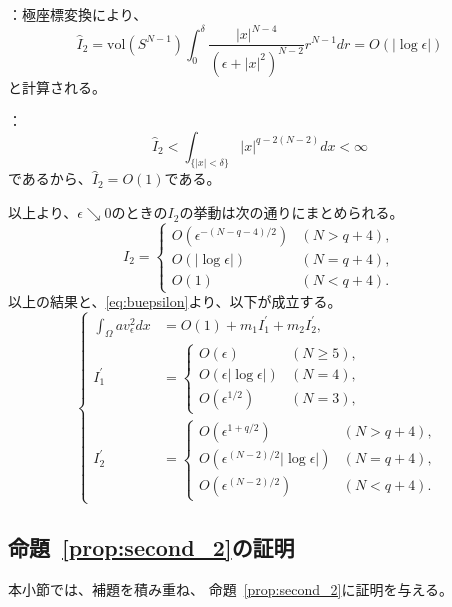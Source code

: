 ：極座標変換により、
\[
 \hat{I}_2 = \mathrm{vol}(S^{N-1}) \int_0^{\delta} \frac{ \lvert x
 \rvert^{N-4}}{(\epsilon + \lvert x \rvert^2)^{N-2}} r^{N-1} dr =
 O(\lvert \log \epsilon \rvert)
\]
と計算される。

：
\[
 \hat{I}_2 < \int_{ \{ \lvert x \rvert < \delta \}} \lvert x \rvert^{q -
 2(N-2)} dx < \infty
\]
であるから、$\hat{I}_2 = O(1)$である。

以上より、$\epsilon \searrow 0$のときの$I_2$の挙動は次の通りにまとめられる。
\[
 I_2 = \begin{cases}
        O(\epsilon^{-(N-q-4)/2}) & (N > q + 4),\\
        O(\lvert \log \epsilon \rvert) & (N = q + 4), \\ 
        O(1) & (N < q + 4).
       \end{cases}
\]
以上の結果と、\eqref{eq:buepsilon}より、以下が成立する。
\begin{equation}
 \left\{ 
 \begin{aligned}
  \int_\Omega a v_\epsilon^2 dx &= O(1) + m_1 I_1^\prime + m_2
  I_2^\prime, \\
  I_1^\prime &= \begin{cases}
                 O(\epsilon) & (N \geq 5), \\
                 O(\epsilon \lvert \log \epsilon \rvert) & (N = 4), \\
                 O(\epsilon^{1/2}) & (N = 3),
                \end{cases} \\
  I_2^\prime &= \begin{cases}
                 O(\epsilon^{1 + q/2 }) & (N > q + 4), \\
                 O(\epsilon^{(N-2)/2} \lvert \log \epsilon \rvert) & (N =
                 q + 4), \\
                 O(\epsilon^{(N-2)/2}) & (N < q + 4).
                \end{cases}
 \end{aligned} \right. \label{eq:av_epsilon}
\end{equation}

\subsection{命題~\ref{prop:second_2}の証明}

本小節では、補題を積み重ね、
命題~\ref{prop:second_2}に証明を与える。

